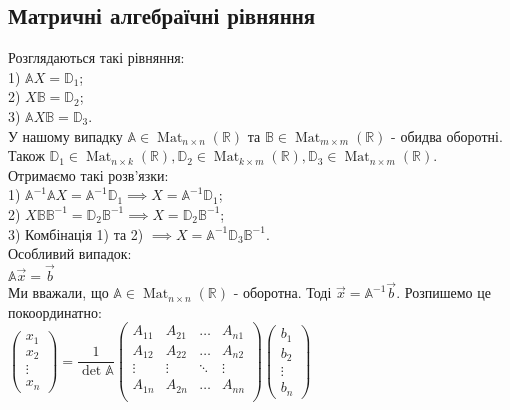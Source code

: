 \documentclass[a4paper, 10pt]{article}
\theoremstyle{theoremdd}
\DeclareMathOperator{\Mat}{Mat}
\begin{document}
\subsection{Матричні алгебраїчні рівняння}
Розглядаються такі рівняння:\\
1) $\mathbb{A} X = \mathbb{D}_1$;\\
2) $X \mathbb{B} = \mathbb{D}_2$;\\
3) $\mathbb{A} X \mathbb{B} = \mathbb{D}_3$.\\
У нашому випадку $\mathbb{A} \in \Mat_{n \times n}(\mathbb{R})$ та $\mathbb{B} \in \Mat_{m \times m}(\mathbb{R})$ - обидва оборотні.\\
Також $\mathbb{D}_1 \in \Mat_{n \times k}(\mathbb{R}), \mathbb{D}_2 \in \Mat_{k \times m}(\mathbb{R}), \mathbb{D}_3 \in \Mat_{n \times m}(\mathbb{R})$.\\
Отримаємо такі розв'язки:\\
1) $\mathbb{A}^{-1} \mathbb{A} X = \mathbb{A}^{-1} \mathbb{D}_1 \implies X = \mathbb{A}^{-1} \mathbb{D}_1$;\\
2) $X \mathbb{B} \mathbb{B}^{-1} = \mathbb{D}_2 \mathbb{B}^{-1} \implies X = \mathbb{D}_2 \mathbb{B}^{-1}$;\\
3) Комбінація 1) та 2) $\implies X = \mathbb{A}^{-1} \mathbb{D}_3 \mathbb{B}^{-1}$.
\bigskip \\
Особливий випадок:\\
$\mathbb{A} \vec{x} = \vec{b}$\\
Ми вважали, що $\mathbb{A} \in \Mat_{n \times n}(\mathbb{R})$ - оборотна. Тоді $\vec{x} = \mathbb{A}^{-1} \vec{b}$. Розпишемо це покоординатно:\\
$\begin{pmatrix}
x_1 \\ x_2 \\ \vdots \\ x_n
\end{pmatrix} = \dfrac{1}{\det \mathbb{A}} \begin{pmatrix}
A_{11} & A_{21} & \dots & A_{n1} \\
A_{12} & A_{22} & \dots & A_{n2} \\
\vdots & \vdots & \ddots & \vdots \\
A_{1n} & A_{2n} & \dots & A_{nn} \\
\end{pmatrix} \begin{pmatrix}
b_1 \\ b_2 \\ \vdots \\ b_n
\end{pmatrix}$\\
\end{document}
